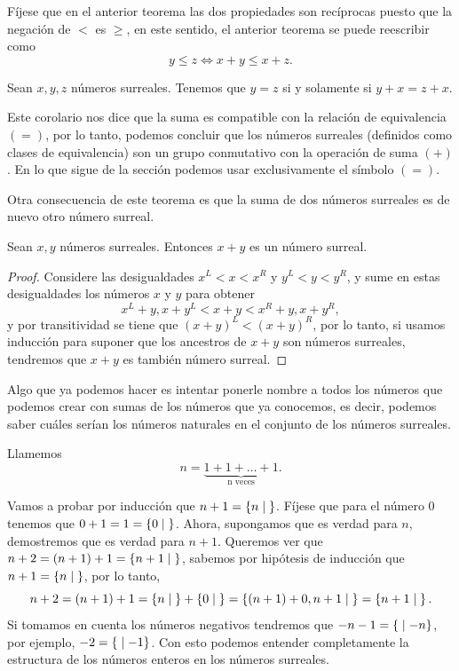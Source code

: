     F\'ijese que en el anterior teorema las dos propiedades son rec\'iprocas puesto que la negaci\'on de $<$ es $\ge$, en este sentido, el anterior teorema se puede reescribir como 
    \[
        y \le z \Leftrightarrow x+y\le x+z.
    \]

    \begin{corollary}
        Sean $x, y, z$ n\'umeros surreales. Tenemos que $y=z$ si y solamente si $y+x=z+x$.
    \end{corollary}

    Este corolario nos dice que la suma es compatible con la relaci\'on de equivalencia $(=)$, por lo tanto, podemos concluir que los n\'umeros surreales (definidos como clases de equivalencia) son un grupo conmutativo con la operaci\'on de suma $(+)$. En lo que sigue de la secci\'on podemos usar exclusivamente el s\'imbolo $(=)$.

    Otra consecuencia de este teorema es que la suma de dos n\'umeros surreales es de nuevo otro n\'umero surreal.

    \begin{corollary}
        Sean $x, y$ n\'umeros surreales. Entonces $x + y$ es un n\'umero surreal.
    \end{corollary}

    \begin{proof}
        Considere las desigualdades $x^L < x < x^R$ y $y^L < y < y^R$, y sume en estas desigualdades los n\'umeros $x$ y $y$ para obtener
        \[
            x^L + y, x + y^L < x+y < x^R + y, x + y^R,
        \]
        y por transitividad se tiene que $(x+y)^L < (x+y)^R$, por lo tanto, si usamos inducci\'on para suponer que los ancestros de $x+y$ son n\'umeros surreales, tendremos que $x+y$ es tambi\'en n\'umero surreal.
    \end{proof}
    
    Algo que ya podemos hacer es intentar ponerle nombre a todos los n\'umeros que podemos crear con sumas de los n\'umeros que ya conocemos, es decir, podemos saber cu\'ales ser\'ian los n\'umeros naturales en el conjunto de los n\'umeros surreales.

    \begin{example}
        Llamemos 
        \[
            n = \underbrace{1+1+\dots+1}_{\text{n veces}}.
        \]

        Vamos a probar por inducci\'on que $n+1 = \left\{n\;\middle|\; \right\}$. F\'ijese que para el n\'umero $0$ tenemos que $0+1 = 1 = \left\{0\;\middle|\; \right\}$. Ahora, supongamos que es verdad para $n$, demostremos que es verdad para $n+1$. Queremos ver que $n+2 = (n+1)+1 = \left\{n+1\;\middle|\; \right\}$, sabemos por hip\'otesis de inducci\'on que $n+1 = \left\{n\;\middle|\; \right\}$, por lo tanto,
        \[
            n+2 = (n+1)+1 = \left\{n\;\middle|\; \right\} + \left\{0\;\middle|\; \right\} = \left\{(n+1)+0, n+1\;\middle|\; \right\} = \left\{n+1\;\middle|\; \right\}.
        \]
        Si tomamos en cuenta los n\'umeros negativos tendremos que $-n-1 = \left\{\;\middle|\; -n\right\}$, por ejemplo, $-2=\left\{\;\middle|\; -1\right\}$. Con esto podemos entender completamente la estructura de los n\'umeros enteros en los n\'umeros surreales.
    \end{example}

